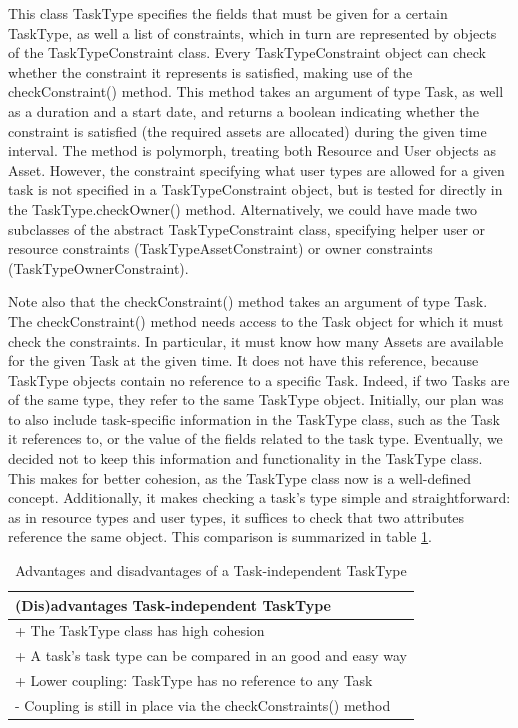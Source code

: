 				This class TaskType specifies the fields that must be given for a certain TaskType, as well a list of constraints, which in turn are represented by objects of the TaskTypeConstraint class. Every TaskTypeConstraint object can check whether the constraint it represents is satisfied, making use of the checkConstraint() method. This method takes an argument of type Task, as well as a duration and a start date, and returns a boolean indicating whether the constraint is satisfied (the required assets are allocated) during the given time interval. The method is polymorph, treating both Resource and User objects as Asset. However, the constraint specifying what user types are allowed for a given task is not specified in a TaskTypeConstraint object, but is tested for directly in the TaskType.checkOwner() method. Alternatively, we could have made two subclasses of the abstract TaskTypeConstraint class, specifying helper user or resource constraints (TaskTypeAssetConstraint) or owner constraints (TaskTypeOwnerConstraint). %
				
				Note also that the checkConstraint() method takes an argument of type Task. The checkConstraint() method needs access to the Task object for which it must check the constraints. In particular, it must know how many Assets are available for the given Task at the given time. It does not have this reference, because TaskType objects contain no reference to a specific Task. Indeed, if two Tasks are of the same type, they refer to the same TaskType object. Initially, our plan was to also include task-specific information in the TaskType class, such as the Task it references to, or the value of the fields related to the task type. Eventually, we decided not to keep this information and functionality in the TaskType class. This makes for better cohesion, as the TaskType class now is a well-defined concept. Additionally, it makes checking a task's type simple and straightforward: as in resource types and user types, it suffices to check that two attributes reference the same object. This comparison is summarized in table \ref{Independent TT}.
			
			\begin{table}
			\begin{tabular}{|l|}
				\hline
				(Dis)advantages Task-independent TaskType \\
				\hline
				+ The TaskType class has high cohesion \\
				+ A task's task type can be compared in an good and easy way \\
				+ Lower coupling: TaskType has no reference to any Task \\
				\hline
				- Coupling is still in place via the checkConstraints() method\\
				\hline
			\end{tabular}

			\caption{Advantages and disadvantages of a Task-independent TaskType}
						\label{Independent TT}
			\end{table}
			
